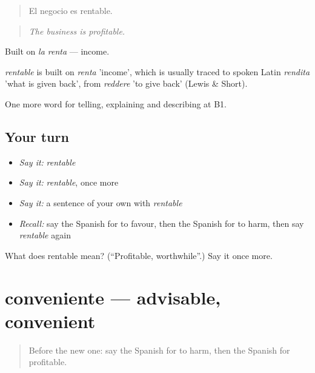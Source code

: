 \begin{quote}
El negocio es rentable.
\end{quote}

\begin{quote}
\emph{The business is profitable.}
\end{quote}

Built on \emph{la renta} — income.

\begin{cousinweb}
\emph{rentable} is built on \emph{renta} 'income', which is usually traced to spoken Latin \emph{rendita} 'what is given back', from \emph{reddere} 'to give back' (Lewis \& Short).
\end{cousinweb}

\begin{grammarlens}[title={What you've built}]
One more word for telling, explaining and describing at B1.
\end{grammarlens}

\subsection*{Your turn}
\begin{itemize}
\raggedright
  \item \emph{Say it:} \emph{rentable}
  \item \emph{Say it:} \emph{rentable}, once more
  \item \emph{Say it:} a sentence of your own with \emph{rentable}
  \item \emph{Recall:} say the Spanish for to favour, then the Spanish for to harm, then say \emph{rentable} again
\end{itemize}

\begin{tcolorbox}[breakable,colback=teal!4,colframe=teal!35!black,title={Before you move on}]
What does rentable mean? (\textquotedblleft{}Profitable, worthwhile\textquotedblright{}.) Say it once more.
\end{tcolorbox}
\section[conveniente]{conveniente — advisable, convenient}

\label{lesson:ES-C637-conveniente}



\begin{quote}
Before the new one: say the Spanish for to harm, then the Spanish for profitable.
\end{quote}

